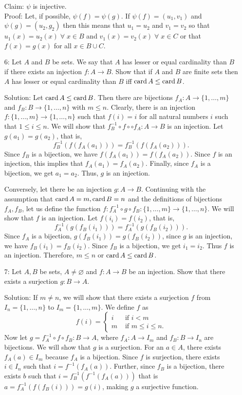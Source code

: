 \begin{enumerate}
Claim: $\psi$ is injective. \\
Proof: Let, if possible, $\psi(f) = \psi(g)$. If $\psi(f) = (u_1, v_1)$ 
and $\psi(g) = (u_2, g_2)$ then this means that $u_1 = u_2$ and $v_1 = v_2$
so that $u_1(x) = u_2(x) \;\forall\; x \in B$ and $v_1(x) = v_2(x) 
\;\forall\; x \in C$ or that $f(x) = g(x)$ for all $x \in B \cup C$.

\item[6:] Let $A$ and $B$ be sets. We say that $A$ has lesser or equal
cardinality than $B$ if there exists an injection $f: A \rightarrow B$.
Show that if $A$ and $B$ are finite sets then $A$ has lesser or equal
cardinality than $B$ iff $\operatorname{card} A \le \operatorname{card} B$.
\item[Solution:] Let $\operatorname{card} A \le \operatorname{card} B$. Then there are bijections
$f_A: A \rightarrow \{1, \ldots, m\}$ and $f_B: B \rightarrow \{1, \ldots,
n\}$ with $m \le n$. Clearly, there is an injection $f: \{1, \ldots, m\}
\rightarrow \{1, \ldots, n\}$ such that $f(i) = i$ for all natural numbers
$i$ such that $1 \le i \le n$. We will show that $f_B^{-1} \circ f \circ
\circ f_A:A \rightarrow B$ is an injection. Let $g(a_1) = g(a_2)$, that is,
\[
f_B^{-1}(f(f_A(a_1))) = f_B^{-1}(f(f_A(a_2))).
\]
Since $f_B$ is a bijection, we have $f(f_A(a_1)) = f(f_A(a_2))$. Since $f$
is an injection, this implies that $f_A(a_1) = f_A(a_2)$. Finally, since
$f_A$ is a bijection, we get $a_1 = a_2$. Thus, $g$ is an injection.

Conversely, let there be an injection $g: A \rightarrow B$. Continuing
with the assumption that $\operatorname{card} A = m, \operatorname{card} B = n$ and the definitions of
bijections $f_A, f_B$, let us define the function $f: f_A^{-1} \circ g
\circ f_B:\{1, \ldots, m\} \rightarrow \{1, \ldots, n\}$. We will show that
$f$ is an injection. Let $f(i_i) = f(i_2)$, that is,
\[
f_A^{-1}(g(f_B(i_1))) = f_A^{-1}(g(f_B(i_2))).
\]
Since $f_A$ is a bijection, $g(f_B(i_1)) = g(f_B(i_2))$, since $g$ is an
injection, we have $f_B(i_1) = f_B(i_2)$. Since $f_B$ is a bijection, we
get $i_1 = i_2$. Thus $f$ is an injection. Therefore, $m \le n$ or $\operatorname{card}
A \le \operatorname{card} B$.

\item[7:] Let $A, B$ be sets, $A \ne \varnothing$ and $f: A \rightarrow
B$ be an injection. Show that there exists a surjection $g: B \rightarrow
A$.
\item[Solution:] If $m \ne n$, we will show that there exists a surjection
$f$ from $I_n = \{1, \ldots, n\}$ to $I_m = \{1, \ldots, m\}$. We define
$f$ as 
\[
f(i) = \begin{cases}
    i & \text{ if } i < m \\
    m & \text{ if } m \le i \le n.
\end{cases}
\]
Now let $g = f_A^{-1} \circ f \circ f_B: B \rightarrow A$, where $f_A: A
\rightarrow I_m$ and $f_B: B \rightarrow I_n$ are bijections. We will show
that $g$ is a surjection. For an $a \in A$, there exists $f_A(a) \in
I_m$ because $f_A$ is a bijection. Since $f$ is surjection, there exists
$i \in I_n$ such that $i = f^{-1}(f_A(a))$. Further, since $f_B$ is
a bijection, there exists $b$ such that $i = f_B^{-1}(f^{-1}(f_A(a)))$
that is $a = f_A^{-1}(f(f_B(i))) = g(i)$, making $g$ a surjective function.


\end{enumerate}
